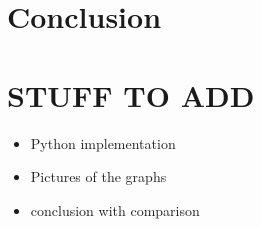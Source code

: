 \documentclass[english]{lni}
\begin{document}
\section{Conclusion}




\section{STUFF TO ADD}
\begin{itemize}
  \item Python implementation
  \item Pictures of the graphs
  \item conclusion with comparison
\end{itemize}



\cite{sra61}



\end{document}
